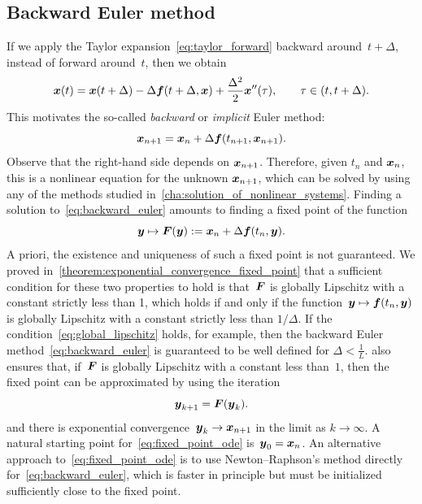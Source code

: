 \subsection{Backward Euler method}
\label{sub:implicit_euler}
If we apply the Taylor expansion~\eqref{eq:taylor_forward} backward around~$t + \Delta$,
instead of forward around~$t$,
then we obtain
\[
    \label{eq:taylor_backward}
    \mathbf{\boldsymbol{x}}(t) = \mathbf{\boldsymbol{x}}(t + \Delta) - \Delta \mathbf{\boldsymbol{f}}(t + \Delta, \mathbf{\boldsymbol{x}}) + \frac{\Delta^2}{2} \mathbf{\boldsymbol{x}}''(\tau),
    \qquad \tau \in (t, t+\Delta).
\]
This motivates the so-called \emph{backward} or \emph{implicit} Euler method:
\begin{equation}
    \label{eq:backward_euler}
    \mathbf{\boldsymbol{x}}_{n+1} = \mathbf{\boldsymbol{x}}_{n} + \Delta \mathbf{\boldsymbol{f}}(t_{n+1}, \mathbf{\boldsymbol{x}}_{n+1}).
\end{equation}
Observe that the right-hand side depends on $\mathbf{\boldsymbol{x}}_{n+1}$.
Therefore, given $t_n$ and $\mathbf{\boldsymbol{x}}_n$,
this is a nonlinear equation for the unknown $\mathbf{\boldsymbol{x}}_{n+1}$,
which can be solved by using any of the methods studied in~\cref{cha:solution_of_nonlinear_systems}.
Finding a solution to~\eqref{eq:backward_euler} amounts to finding a fixed point of the function
\[
    \mathbf{\boldsymbol{y}} \mapsto \mathbf{\boldsymbol{F}}(\mathbf{\boldsymbol{y}}) := \mathbf{\boldsymbol{x}}_{n} + \Delta \mathbf{\boldsymbol{f}}(t_n, \mathbf{\boldsymbol{y}}).
\]
A priori, the existence and uniqueness of such a fixed point is not guaranteed.
We proved in~\cref{theorem:exponential_convergence_fixed_point} that a sufficient condition for these two properties to hold is
that~$\mathbf{\boldsymbol{F}}$ is globally Lipschitz with a constant strictly less than 1,
which holds if and only if the function~$\mathbf{\boldsymbol{y}} \mapsto \mathbf{\boldsymbol{f}}(t_n, \mathbf{\boldsymbol{y}})$ is globally Lipschitz with a constant strictly less than $1/\Delta$.
If the condition~\eqref{eq:global_lipschitz} holds, for example,
then the backward Euler method~\eqref{eq:backward_euler} is guaranteed to be well defined for $\Delta < \frac{1}{L}$.
 also ensures that, if~$\mathbf{\boldsymbol{F}}$ is globally Lipschitz with a constant less than~$1$,
then the fixed point can be approximated by using the iteration
\begin{equation}
    \label{eq:fixed_point_ode}
    \mathbf{\boldsymbol{y}}_{k+1} = \mathbf{\boldsymbol{F}}(\mathbf{\boldsymbol{y}}_k).
\end{equation}
and there is exponential convergence~$\mathbf{\boldsymbol{y}}_k \to \mathbf{\boldsymbol{x}}_{n+1}$ in the limit as $k \to \infty$.
A natural starting point for~\eqref{eq:fixed_point_ode} is~$\mathbf{\boldsymbol{y}}_0 = \mathbf{\boldsymbol{x}}_n$.
An alternative approach to~\eqref{eq:fixed_point_ode} is to use Newton--Raphson's method directly for~\eqref{eq:backward_euler},
which is faster in principle but must be initialized sufficiently close to the fixed point.

